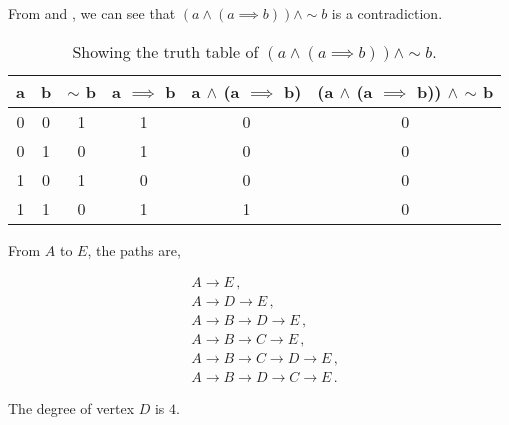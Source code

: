 \begin{subquestions}
From  and , we can see that $(a \land (a \implies b)) \land \sim b$ is a contradiction.

\begin{table}[ht]
	\centering
	\begin{tabular}{|c|c|c|c|c|c|}
		\hline
		a & b & $\sim$ b & a $\implies$ b & a $\land$ (a $\implies$ b) & (a $\land$ (a $\implies$ b)) $\land$ $\sim$ b \\
		\hline
		0 & 0 & 1 & 1 & 0 & 0 \\
		0 & 1 & 0 & 1 & 0 & 0 \\
		1 & 0 & 1 & 0 & 0 & 0 \\
		1 & 1 & 0 & 1 & 1 & 0 \\
		\hline
	\end{tabular}
	\caption{\label{2009:q2:tab:TruthTab1} Showing the truth table of $(a \land (a \implies b)) \land \sim b$.}
\end{table}


\subquestion

From $A$ to $E$, the paths are,

\begin{align}
	& A \rightarrow E\,, \\
	& A \rightarrow D \rightarrow E\,, \\
	& A \rightarrow B \rightarrow D \rightarrow E\,, \\
	& A \rightarrow B \rightarrow C \rightarrow E\,, \\
	& A \rightarrow B \rightarrow C \rightarrow D \rightarrow E\,, \\
	& A \rightarrow B \rightarrow D \rightarrow C \rightarrow E\,. 	
\end{align}


\subquestion

The degree of vertex $D$ is $4$.



\end{subquestions}
